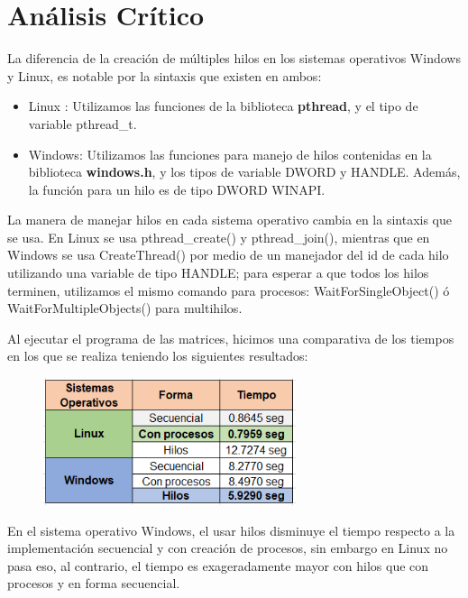 \documentclass[12pt]{article}
\begin{document}
	\section{Análisis Crítico}
	 La diferencia de la creación de múltiples hilos en los sistemas operativos Windows y Linux, es notable por la sintaxis que existen en ambos:
	    \begin{itemize}
	        \item Linux : Utilizamos las funciones de la biblioteca \textbf{pthread}, y el tipo de variable pthread\_t.
	        \item Windows: Utilizamos las funciones para manejo de hilos contenidas en la biblioteca \textbf{windows.h}, y los tipos de variable DWORD y HANDLE. Además, la función para un hilo es de tipo DWORD WINAPI.
	    \end{itemize}
	   
	   La manera de manejar hilos en cada sistema operativo cambia en la sintaxis que se usa. En Linux se usa pthread\_create() y pthread\_join(), mientras que en Windows se usa CreateThread() por medio de un manejador del id de cada hilo utilizando una variable de tipo HANDLE; para esperar a que todos los hilos terminen, utilizamos el mismo comando para procesos: WaitForSingleObject() ó WaitForMultipleObjects() para multihilos.
	   
	   Al ejecutar el programa de las matrices, hicimos una comparativa de los tiempos en los que se realiza teniendo los siguientes resultados:

    	\begin{figure}[h!]
    	    \centering
    	    \includegraphics[width=0.66\textwidth]{Practica5/Images/tiempos.PNG}
    	\end{figure}
        En el sistema operativo Windows, el usar hilos disminuye el tiempo respecto a la implementación secuencial y con creación de procesos, sin embargo en Linux no pasa eso, al contrario, el tiempo es exageradamente mayor con hilos que con procesos y en forma secuencial. 

	
\end{document}
